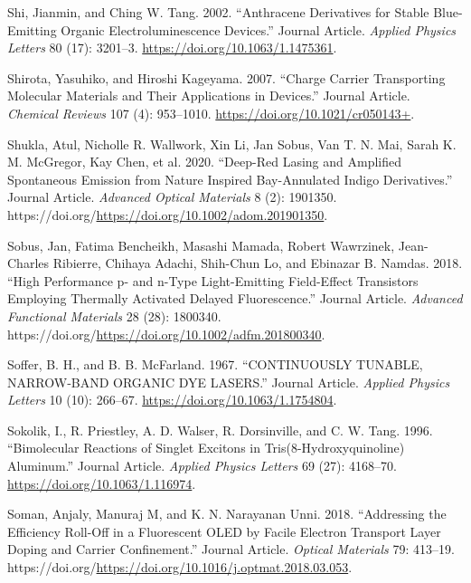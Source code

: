 \documentclass[
  letterpaper,
  DIV=11,
  numbers=noendperiod,
  oneside]{scrreprt}
\newlength{\cslhangindent}
\newlength{\cslentryspacingunit} %
\newenvironment{CSLReferences}[2] %
 {%
  \setlength{\parindent}{0pt}
  \ifodd #1
  \let\oldpar\par
  \def\par{\hangindent=\cslhangindent\oldpar}
  \fi
  \setlength{\parskip}{#2\cslentryspacingunit}
 }%
 {}
\begin{document}
\begin{CSLReferences}{1}{0}
\leavevmode{}%
Shi, Jianmin, and Ching W. Tang. 2002. {``Anthracene Derivatives for
Stable Blue-Emitting Organic Electroluminescence Devices.''} Journal
Article. \emph{Applied Physics Letters} 80 (17): 3201--3.
\url{https://doi.org/10.1063/1.1475361}.

\leavevmode{}%
Shirota, Yasuhiko, and Hiroshi Kageyama. 2007. {``Charge Carrier
Transporting Molecular Materials and Their Applications in Devices.''}
Journal Article. \emph{Chemical Reviews} 107 (4): 953--1010.
\url{https://doi.org/10.1021/cr050143+}.

\leavevmode{}%
Shukla, Atul, Nicholle R. Wallwork, Xin Li, Jan Sobus, Van T. N. Mai,
Sarah K. M. McGregor, Kay Chen, et al. 2020. {``Deep-Red Lasing and
Amplified Spontaneous Emission from Nature Inspired Bay-Annulated Indigo
Derivatives.''} Journal Article. \emph{Advanced Optical Materials} 8
(2): 1901350.
https://doi.org/\url{https://doi.org/10.1002/adom.201901350}.

\leavevmode{}%
Sobus, Jan, Fatima Bencheikh, Masashi Mamada, Robert Wawrzinek,
Jean-Charles Ribierre, Chihaya Adachi, Shih-Chun Lo, and Ebinazar B.
Namdas. 2018. {``High Performance p- and n-Type Light-Emitting
Field-Effect Transistors Employing Thermally Activated Delayed
Fluorescence.''} Journal Article. \emph{Advanced Functional Materials}
28 (28): 1800340.
https://doi.org/\url{https://doi.org/10.1002/adfm.201800340}.

\leavevmode{}%
Soffer, B. H., and B. B. McFarland. 1967. {``CONTINUOUSLY TUNABLE,
NARROW‐BAND ORGANIC DYE LASERS.''} Journal Article. \emph{Applied
Physics Letters} 10 (10): 266--67.
\url{https://doi.org/10.1063/1.1754804}.

\leavevmode{}%
Sokolik, I., R. Priestley, A. D. Walser, R. Dorsinville, and C. W. Tang.
1996. {``Bimolecular Reactions of Singlet Excitons in
Tris(8-Hydroxyquinoline) Aluminum.''} Journal Article. \emph{Applied
Physics Letters} 69 (27): 4168--70.
\url{https://doi.org/10.1063/1.116974}.

\leavevmode{}%
Soman, Anjaly, Manuraj M, and K. N. Narayanan Unni. 2018. {``Addressing
the Efficiency Roll-Off in a Fluorescent OLED by Facile Electron
Transport Layer Doping and Carrier Confinement.''} Journal Article.
\emph{Optical Materials} 79: 413--19.
https://doi.org/\url{https://doi.org/10.1016/j.optmat.2018.03.053}.


\end{CSLReferences}
\end{document}
